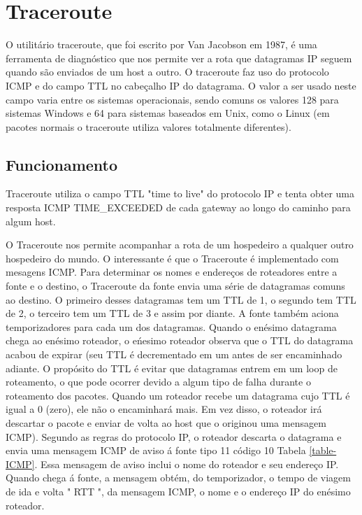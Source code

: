 \documentclass[
	article,			%
	11pt,				%
	oneside,			%
	a4paper,			%
	english,			%
	brazil,				%
	sumario=tradicional
	]{abntex2}
\begin{document}
\section{Traceroute}
O utilitário traceroute, que foi escrito por Van Jacobson em 1987, é uma ferramenta de diagnóstico que nos permite ver a rota que datagramas IP seguem quando são enviados de um host a outro. O traceroute faz uso do protocolo ICMP e do campo TTL no cabeçalho IP do datagrama. O valor a ser usado neste campo varia entre os sistemas operacionais, sendo comuns os valores 128 para sistemas Windows e 64 para sistemas baseados em Unix, como o Linux (em pacotes normais o traceroute utiliza valores totalmente diferentes).

\subsection{Funcionamento} \label{sec:funcioanemnto}
Traceroute utiliza o campo TTL "time to live" do protocolo IP e tenta obter uma resposta ICMP TIME\_EXCEEDED de cada gateway ao longo do caminho para algum host.

O Traceroute nos permite acompanhar a rota de um hospedeiro a qualquer outro hospedeiro do mundo. O interessante é que o Traceroute é implementado com mesagens ICMP. Para determinar os nomes e endereços de roteadores entre a fonte e o destino, o Traceroute da fonte envia uma série de datagramas comuns ao destino. O primeiro desses datagramas tem um TTL de 1, o segundo tem TTL de 2, o terceiro tem um TTL de 3 e assim por diante. A fonte também aciona temporizadores para cada um dos datagramas. Quando o enésimo datagrama chega ao enésimo roteador, o eńesimo roteador observa que o TTL do datagrama acabou de expirar (seu TTL é decrementado em um antes de ser encaminhado adiante. O propósito do TTL é evitar que datagramas entrem em um loop de roteamento, o que pode ocorrer devido a algum tipo de falha durante o roteamento dos pacotes. Quando um roteador recebe um datagrama cujo TTL é igual a 0 (zero), ele não o encaminhará mais. Em vez disso, o roteador irá descartar o pacote e enviar de volta ao host que o originou uma mensagem ICMP). Segundo as regras do protocolo IP, o roteador descarta o datagrama e envia uma mensagem ICMP de aviso á fonte tipo 11 código 10 Tabela \ref{table-ICMP}. Essa mensagem de aviso inclui o nome do roteador e seu endereço IP. Quando chega á fonte, a mensagem obtém, do temporizador, o tempo de viagem de ida e volta " RTT ", da mensagem ICMP, o nome e o endereço IP do enésimo roteador.\cite{Kurose}
 
\end{document}
